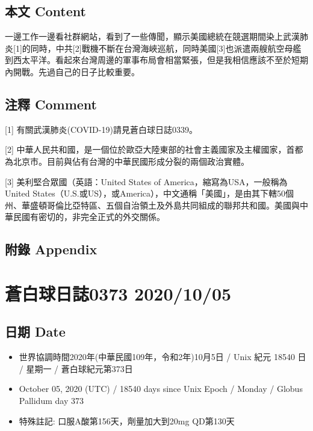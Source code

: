 \documentclass[
]{article}
\providecommand{\tightlist}{%
  \setlength{\itemsep}{0pt}\setlength{\parskip}{0pt}}
\begin{document}
\hypertarget{ux672cux6587-content-3}{%
\subsection{本文 Content}\label{ux672cux6587-content-3}}

一邊工作一邊看社群網站，看到了一些傳聞，顯示美國總統在競選期間染上武漢肺炎{[}1{]}的同時，中共{[}2{]}戰機不斷在台灣海峽巡航，同時美國{[}3{]}也派遣兩艘航空母艦到西太平洋。看起來台灣周邊的軍事布局會相當緊張，但是我相信應該不至於短期內開戰。先過自己的日子比較重要。

\hypertarget{ux6ce8ux91cb-comment-3}{%
\subsection{注釋 Comment}\label{ux6ce8ux91cb-comment-3}}

{[}1{]} 有關武漢肺炎(COVID-19)請見蒼白球日誌0339。

{[}2{]}
中華人民共和國，是一個位於歐亞大陸東部的社會主義國家及主權國家，首都為北京市。目前與佔有台灣的中華民國形成分裂的兩個政治實體。

{[}3{]} 美利堅合眾國（英語：United States of
America，縮寫為USA，一般稱為United
States（U.S.或US），或America），中文通稱「美國」，是由其下轄50個州、華盛頓哥倫比亞特區、五個自治領土及外島共同組成的聯邦共和國。美國與中華民國有密切的，非完全正式的外交關係。

\hypertarget{ux9644ux9304-appendix-3}{%
\subsection{附錄 Appendix}\label{ux9644ux9304-appendix-3}}

\hypertarget{ux84bcux767dux7403ux65e5ux8a8c0373-20201005}{%
\section{蒼白球日誌0373
2020/10/05}\label{ux84bcux767dux7403ux65e5ux8a8c0373-20201005}}

\hypertarget{ux65e5ux671f-date-4}{%
\subsection{日期 Date}\label{ux65e5ux671f-date-4}}

\begin{itemize}
\tightlist
\item
  世界協調時間2020年(中華民國109年，令和2年)10月5日 / Unix 紀元 18540 日
  / 星期一 / 蒼白球紀元第373日
\item
  October 05, 2020 (UTC) / 18540 days since Unix Epoch / Monday / Globus
  Pallidum day 373
\item
  特殊註記: 口服A酸第156天，劑量加大到20mg QD第130天
\end{itemize}
\end{document}
